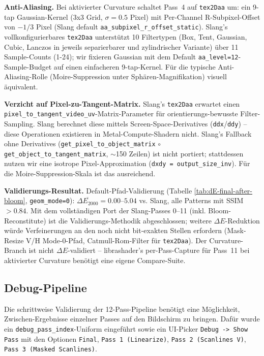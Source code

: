 \documentclass[11pt, a4paper]{article}
\begin{document}
\vspace{.5cm}
\textbf{Anti-Aliasing.} Bei aktivierter Curvature schaltet Pass~4 auf \texttt{tex2Daa} um: ein 9-tap Gaussian-Kernel (3x3 Grid, $\sigma=0.5$ Pixel) mit Per-Channel R-Subpixel-Offset von $-1/3$ Pixel (Slang default \texttt{aa\_subpixel\_r\_offset\_static}). Slang's vollkonfigurierbares \texttt{tex2Daa} unterst\"utzt 10 Filtertypen (Box, Tent, Gaussian, Cubic, Lanczos in jeweils separierbarer und zylindrischer Variante) \"uber 11 Sample-Counts (1-24); wir fixieren Gaussian mit dem Default \texttt{aa\_level=12}-Sample-Budget auf einen einfacheren 9-tap-Kernel. F\"ur die typische Anti-Aliasing-Rolle (Moire-Suppression unter Sph\"aren-Magnifikation) visuell \"aquivalent.

\vspace{.5cm}
\textbf{Verzicht auf Pixel-zu-Tangent-Matrix.} Slang's \texttt{tex2Daa} erwartet einen \texttt{pixel\_to\_tangent\_video\_uv}-Matrix-Parameter f\"ur orientierungs-bewusste Filter-Sampling. Slang berechnet diese mittels Screen-Space-Derivatives (\texttt{ddx}/\texttt{ddy}) -- diese Operationen existieren in Metal-Compute-Shadern nicht. Slang's Fallback ohne Derivatives (\texttt{get\_pixel\_to\_object\_matrix} $\circ$ \texttt{get\_object\_to\_tangent\_matrix}, $\sim$150 Zeilen) ist nicht portiert; stattdessen nutzen wir eine isotrope Pixel-Approximation (\texttt{dxdy = output\_size\_inv}). F\"ur die Moire-Suppression-Skala ist das ausreichend.

\vspace{.5cm}
\textbf{Validierungs-Resultat.} Default-Pfad-Validierung (Tabelle \ref{tab:dE-final-after-bloom}, \texttt{geom\_mode=0}): $\overline{\Delta E_{2000}} = 0.00$--$5.04$ vs. Slang, alle Patterns mit SSIM $> 0.84$. Mit dem vollst\"andigen Port der Slang-Passes 0--11 (inkl. Bloom-Reconstitute) ist die Validierungs-Methodik abgeschlossen; weitere $\Delta E$-Reduktion w\"urde Verfeinerungen an den noch nicht bit-exakten Stellen erfordern (Mask-Resize V/H Mode-0-Pfad, Catmull-Rom-Filter f\"ur \texttt{tex2Daa}). Der Curvature-Branch ist nicht $\Delta E$-validiert -- librashader's per-Pass-Capture f\"ur Pass~11 bei aktivierter Curvature ben\"otigt eine eigene Compare-Suite.

\vspace{.5cm}
\subsection{Debug-Pipeline}
\vspace{.5cm}
Die schrittweise Validierung der 12-Pass-Pipeline ben\"otigt eine M\"oglichkeit, Zwischen-Ergebnisse einzelner Passes auf den Bildschirm zu bringen. Daf\"ur wurde ein \texttt{debug\_pass\_index}-Uniform eingef\"uhrt sowie ein UI-Picker \texttt{Debug -> Show Pass} mit den Optionen \texttt{Final}, \texttt{Pass 1 (Linearize)}, \texttt{Pass 2 (Scanlines V)}, \texttt{Pass 3 (Masked Scanlines)}.
\end{document}
